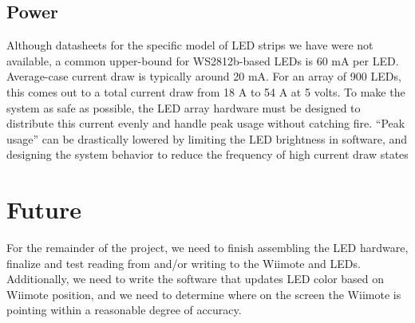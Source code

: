 \documentclass{tufte-handout}
\begin{document}
\subsection{Power}
Although datasheets for the specific model of LED strips we have were not
available, a common upper-bound for WS2812b-based 
LEDs is 60 mA per LED. Average-case current draw is typically around
    20 mA. For an array of 900 LEDs, this comes out to a total current draw
    from 18 A to 54 A at 5 volts. To make the system as safe as possible, the
    LED array hardware must be designed to distribute this current evenly and
    handle peak usage without catching fire. ``Peak usage'' can be drastically
    lowered by limiting the LED brightness in software, and designing the
    system behavior to reduce the frequency of high current draw
    states
\section{Future}

For the remainder of the project, we need to finish assembling the LED
hardware, finalize and test reading from and/or writing to the Wiimote and
LEDs. Additionally, we need to write the software that updates LED color based
on Wiimote position, and we need to determine where on the screen the Wiimote
is pointing within a reasonable degree of accuracy.
\end{document}
